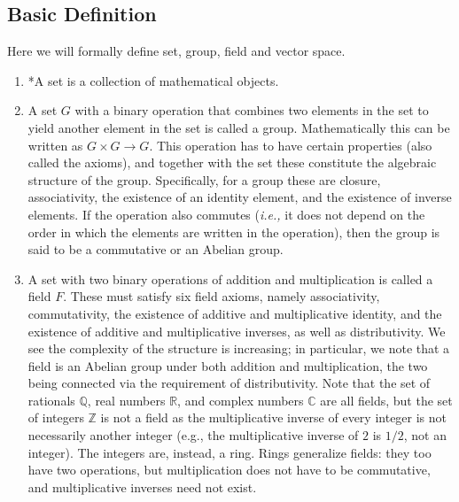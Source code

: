 \documentclass[a4paper,12pt]{report}
\begin{document}
\begin{appendices}
\chapter{Basic Definition}

Here we will formally define set, group, field and vector space.

\begin{enumerate}
\item  *A set is a collection of mathematical objects.

\item  A set \( G \) with a binary operation that combines two elements in the set to yield another element in the set is called a group. Mathematically this can be written as \( G \times G \to G \). This operation has to have certain properties (also called the axioms), and together with the set these constitute the algebraic structure of the group. Specifically, for a group these are closure, associativity, the existence of an identity element, and the existence of inverse elements. If the operation also commutes (\textit{i.e.,}  it does not depend on the order in which the elements are written in the operation), then the group is said to be a commutative or an Abelian group.

\item  A set with two binary operations of addition and multiplication is called a field \( F \). These must satisfy six field axioms, namely associativity, commutativity, the existence of additive and multiplicative identity, and the existence of additive and multiplicative inverses, as well as distributivity. We see the complexity of the structure is increasing; in particular, we note that a field is an Abelian group under both addition and multiplication, the two being connected via the requirement of distributivity. Note that the set of rationals \( \mathbb{Q} \), real numbers \( \mathbb{R} \), and complex numbers \( \mathbb{C} \) are all fields, but the set of integers \( \mathbb{Z} \) is not a field as the multiplicative inverse of every integer is not necessarily another integer (e.g., the multiplicative inverse of \( 2 \) is \( 1/2 \), not an integer). The integers are, instead, a ring. Rings generalize fields: they too have two operations, but multiplication does not have to be commutative, and multiplicative inverses need not exist.


\end{enumerate}
\end{appendices}
\end{document}
